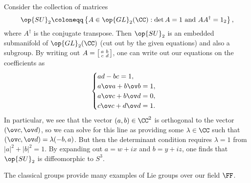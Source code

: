 \documentclass[../notes.tex]{subfiles}
\begin{document}
\begin{example} \label{ex:su2}
	Consider the collection of matrices
	\[{\op{SU}_2}\coloneqq\left\{A\in\op{GL}_2(\CC):\det A=1\text{ and }AA^\dagger=1_2\right\},\]
	where $A^\dagger$ is the conjugate transpose. Then $\op{SU}_2$ is an embedded submanifold of $\op{GL}_2(\CC)$ (cut out by the given equations) and also a subgroup. By writing out $A=\begin{bsmallmatrix}
		a & b \\ c & d
	\end{bsmallmatrix}$, one can write out our equations on the coefficients as
	\[\begin{cases}
		ad-bc=1, \\
		a\ov a+b\ov b=1, \\
		a\ov c+b\ov d=0, \\
		c\ov c+d\ov d=1.
	\end{cases}\]
	In particular, we see that the vector $(a,b)\in\CC^2$ is orthogonal to the vector $(\ov c,\ov d)$, so we can solve for this line as providing some $\lambda\in\CC$ such that $(\ov c,\ov d)=\lambda(-b,a)$. But then the determinant condition requires $\lambda=1$ from $\left|a\right|^2+\left|b\right|^2=1$. By expanding out $a=w+ix$ and $b=y+iz$, one finds that $\op{SU}_2$ is diffeomorphic to $S^3$.
\end{example}
The classical groups provide many examples of Lie groups over our field $\FF$.
\end{document}
